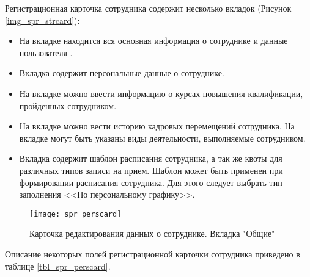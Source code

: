 Регистрационная карточка сотрудника содержит несколько вкладок (Рисунок \ref{img_spr_strcard}):
\begin{itemize}
 \item На вкладке  находится вся основная информация о сотруднике и данные пользователя \tmis.
 \item Вкладка  содержит персональные данные о сотруднике.
 \item На вкладке  можно ввести информацию о курсах повышения квалификации, пройденных сотрудником.
 \item На вкладке  можно вести историю кадровых перемещений сотрудника.
 На вкладке  могут быть указаны виды деятельности, выполняемые сотрудником.
 \item Вкладка  содержит шаблон расписания сотрудника, а так же квоты для различных типов записи на прием. Шаблон может быть применен при формировании расписания сотрудника. Для этого следует выбрать тип заполнения <<По персональному графику>>.
\end{itemize}
 
\begin{figure}[ht!]\centering
 \texttt{[image: spr\_perscard]}
 \caption{Карточка редактирования данных о сотруднике. Вкладка "Общие"}
 \label{img_spr_perscard}
\end{figure}

Описание некоторых полей регистрационной карточки сотрудника приведено в таблице \ref{tbl_spr_perscard}.

